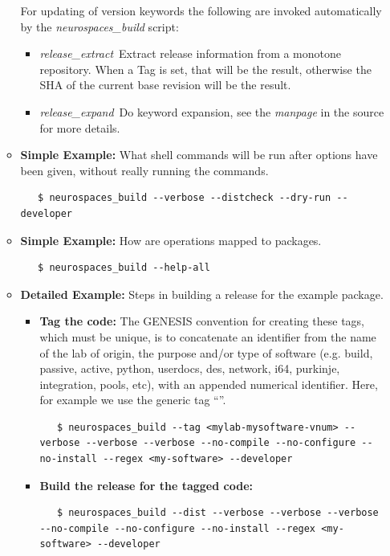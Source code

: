 \documentclass[12pt]{article}
\begin{document}
\begin{enumerate}
\begin{itemize}
For updating of version keywords the following are invoked automatically by the {\it neurospaces\_build} script:
   \begin{itemize}
       \item {\it release\_extract}\,\,\,Extract release information from a monotone repository. When a Tag is set, that will be the result, otherwise the SHA of the current base revision will be the result.
      \item {\it release\_expand}\,\,\,Do keyword expansion, see the {\it manpage} in the source for more details.
   \end{itemize}
      \item{\bf Simple Example:} What shell commands will be run after options have been given, without really running the commands.
\begin{verbatim}
   $ neurospaces_build --verbose --distcheck --dry-run --developer
\end{verbatim}
      \item{\bf Simple Example:} How are operations mapped to packages.
\begin{verbatim}
   $ neurospaces_build --help-all
\end{verbatim}
      \item{\bf Detailed Example:} Steps in building a release for the example {\tt <your-software>} package.
      \begin{itemize}
         \item {\bf Tag the code:} The GENESIS convention for creating these tags, which must be unique, is to concatenate an identifier from the name of the lab of origin, the purpose and/or type of software (e.g. build, passive, active, python, userdocs, des, network, i64, purkinje, integration, pools, etc), with an appended numerical identifier. Here, for example we use the generic tag ``{\tt <mylab-mysoftware-vnum>}''.
\begin{verbatim}
   $ neurospaces_build --tag <mylab-mysoftware-vnum> --verbose --verbose --verbose --no-compile --no-configure --no-install --regex <my-software> --developer
\end{verbatim}

         \item {\bf Build the release for the tagged code:}
\begin{verbatim}
   $ neurospaces_build --dist --verbose --verbose --verbose --no-compile --no-configure --no-install --regex <my-software> --developer
\end{verbatim}


\end{itemize}
\end{itemize}
\end{enumerate}
\end{document}
